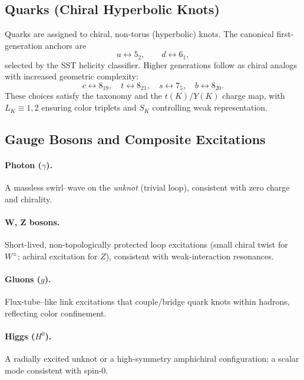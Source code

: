 \documentclass[smallextended]{svjour3}       %
\begin{document}
    \subsection{Quarks (Chiral Hyperbolic Knots)}

    Quarks are assigned to chiral, non-torus (hyperbolic) knots. The canonical first-generation anchors are
    \[
        u \leftrightarrow 5_2,\qquad d \leftrightarrow 6_1,
    \]
    selected by the SST helicity classifier. Higher generations follow as chiral analogs with increased geometric complexity:
    \[
        c \leftrightarrow 8_{19},\quad
        t \leftrightarrow 8_{21},\quad
        s \leftrightarrow 7_{5},\quad
        b \leftrightarrow 8_{20}.
    \]
    These choices satisfy the taxonomy and the $t(K)$/$Y(K)$ charge map, with $L_K\!\equiv\!1,2$ ensuring color triplets and $S_K$ controlling weak representation.

    \subsection{Gauge Bosons and Composite Excitations}

    \paragraph{Photon ($\gamma$).}
        A massless swirl–wave on the \emph{unknot} (trivial loop), consistent with zero charge and chirality.

    \paragraph{W, Z bosons.}
        Short-lived, non-topologically protected loop excitations (small chiral twist for $W^\pm$; achiral excitation for $Z$), consistent with weak-interaction resonances.

    \paragraph{Gluons ($g$).}
        Flux-tube–like link excitations that couple/bridge quark knots within hadrons, reflecting color confinement.

    \paragraph{Higgs ($H^0$).}
        A radially excited unknot or a high-symmetry amphichiral configuration; a scalar mode consistent with spin-0.
\end{document}
